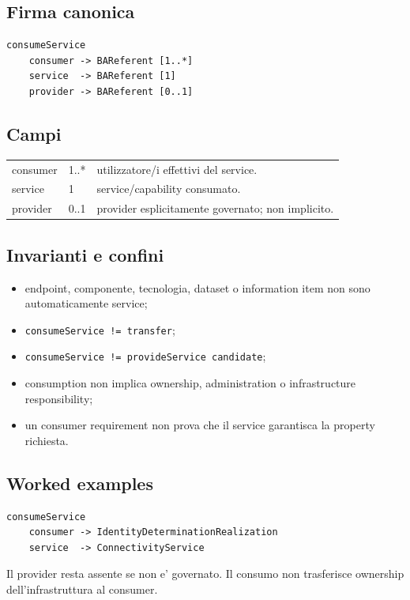 \documentclass[11pt,a4paper]{article}
\begin{document}
\subsection{Firma canonica}
\begin{lstlisting}
consumeService
    consumer -> BAReferent [1..*]
    service  -> BAReferent [1]
    provider -> BAReferent [0..1]
\end{lstlisting}

\subsection{Campi}
\begin{tabularx}{\textwidth}{L{36mm}L{24mm}Y}
\toprule
consumer & 1..* & utilizzatore/i effettivi del service. \\
service & 1 & service/capability consumato. \\
provider & 0..1 & provider esplicitamente governato; non implicito. \\
\bottomrule
\end{tabularx}

\subsection{Invarianti e confini}
\begin{itemize}
  \item endpoint, componente, tecnologia, dataset o information item non sono automaticamente service;
  \item \texttt{consumeService != transfer};
  \item \texttt{consumeService != provideService candidate};
  \item consumption non implica ownership, administration o infrastructure responsibility;
  \item un consumer requirement non prova che il service garantisca la property richiesta.
\end{itemize}


\subsection{Worked examples}
\begin{ddtaexample}[title={Facial Access - consumo del servizio di connettivita'}]
\begin{lstlisting}
consumeService
    consumer -> IdentityDeterminationRealization
    service  -> ConnectivityService
\end{lstlisting}
Il provider resta assente se non e' governato. Il consumo non trasferisce ownership dell'infrastruttura al consumer.
\end{ddtaexample}
\end{document}
